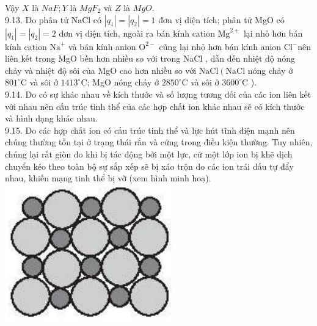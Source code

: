 \documentclass[10pt]{article}
\begin{document}
Vậy $X$ là $N a F ; Y$ là $M g F_{2}$ và $Z$ là $M g O$.\\
9.13. Do phân tử NaCl có $\left|q_{1}\right|=\left|q_{2}\right|=1$ đơn vị diện tích; phân tử MgO có $\left|q_{1}\right|=\left|q_{2}\right|=2$ đơn vị diện tích, ngoài ra bán kính cation $\mathrm{Mg}^{2+}$ lại nhỏ hơn bán kính cation $\mathrm{Na}^{+}$ và bán kính anion $\mathrm{O}^{2-}$ cũng lại nhỏ hơn bán kính anion $\mathrm{Cl}^{-}$nên liên kết trong MgO bền hơn nhiều so với trong NaCl , dẫn đến nhiệt độ nóng chảy và nhiệt độ sôi của MgO cao hơn nhiều so với $\mathrm{NaCl}\left(\mathrm{NaCl}\right.$ nóng chảy ở $801^{\circ} \mathrm{C}$ và sôi ở $1413^{\circ} \mathrm{C}$; MgO nóng chảy ở $2850^{\circ} \mathrm{C}$ và sôi ở $3600^{\circ} \mathrm{C}$ ).\\
9.14. Do có sự khác nhau về kích thước và số lượng tương đối của các ion liên kết với nhau nên cấu trúc tinh thể của các hợp chất ion khác nhau sẽ có kích thước và hình dạng khác nhau.\\
9.15. Do các hợp chất ion có cấu trúc tinh thể và lực hút tĩnh điện mạnh nên chúng thường tồn tại ở trạng thái rắn và cứng trong điều kiện thường. Tuy nhiên, chúng lại rất giòn do khi bị tác động bởi một lực, cứ một lớp ion bị khẽ dịch chuyển kéo theo toàn bộ sự sắp xếp sẽ bị xáo trộn do các ion trái dấu tự đẩy nhau, khiến mạng tinh thể bị vỡ (xem hình minh hoạ).\\
\includegraphics[max width=\textwidth, center]{2025_10_23_57761e23b8c46a11c3efg-23(2)}\\
\end{document}
